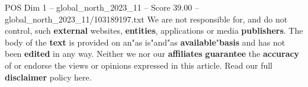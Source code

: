 \begin{textsample}{POS Dim 1 – global\_north\_2023\_11 – Score 39.00 – global\_north\_2023\_11/103189197.txt}
We are not responsible for, and do not control, such \textbf{external} websites, \textbf{entities}, applications or media \textbf{publishers}.
The body of the \textbf{text} is provided on an"as is"and"as \textbf{available}"\textbf{basis} and has not been \textbf{edited} in any way.
Neither we nor our \textbf{affiliates} \textbf{guarantee} the \textbf{accuracy} of or endorse the views or opinions expressed in this article.
Read our full \textbf{disclaimer} policy here.

\end{textsample}
